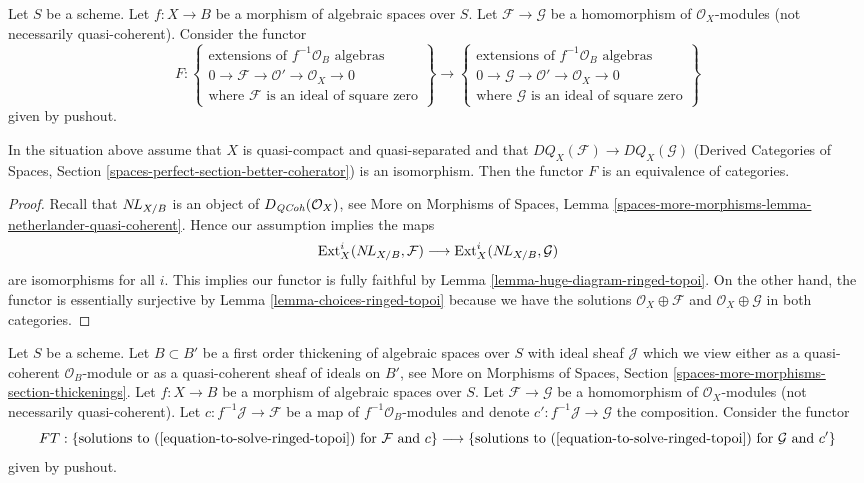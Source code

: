 \noindent
Let $S$ be a scheme. Let $f : X \to B$
be a morphism of algebraic spaces over $S$.
Let $\mathcal{F} \to \mathcal{G}$ be a homomorphism of $\mathcal{O}_X$-modules
(not necessarily quasi-coherent).
Consider the functor
$$
F :
\left\{
\begin{matrix}
\text{extensions of }f^{-1}\mathcal{O}_B\text{ algebras}\\
0 \to \mathcal{F} \to \mathcal{O}' \to \mathcal{O}_X \to 0\\
\text{where }\mathcal{F}\text{ is an ideal of square zero}
\end{matrix}
\right\}
\longrightarrow
\left\{
\begin{matrix}
\text{extensions of }f^{-1}\mathcal{O}_B\text{ algebras}\\
0 \to \mathcal{G} \to \mathcal{O}' \to \mathcal{O}_X \to 0\\
\text{where }\mathcal{G}\text{ is an ideal of square zero}
\end{matrix}
\right\}
$$
given by pushout.

\begin{lemma}
\label{lemma-thickening-space-quasi-coherent}
In the situation above assume that $X$ is quasi-compact and quasi-separated
and that $DQ_X(\mathcal{F}) \to DQ_X(\mathcal{G})$
(Derived Categories of Spaces, Section
\ref{spaces-perfect-section-better-coherator})
is an isomorphism. Then the functor $F$ is an equivalence of categories.
\end{lemma}

\begin{proof}
Recall that $\mathop{N\!L}\nolimits_{X/B}$ is an object of $D_{\mathit{QCoh}}(\mathcal{O}_X)$, see
More on Morphisms of Spaces, Lemma
\ref{spaces-more-morphisms-lemma-netherlander-quasi-coherent}.
Hence our assumption implies the maps
$$
\mathop{\mathrm{Ext}}\nolimits^i_X(\mathop{N\!L}\nolimits_{X/B}, \mathcal{F}) \longrightarrow
\mathop{\mathrm{Ext}}\nolimits^i_X(\mathop{N\!L}\nolimits_{X/B}, \mathcal{G})
$$
are isomorphisms for all $i$. This implies our functor is fully
faithful by Lemma \ref{lemma-huge-diagram-ringed-topoi}.
On the other hand, the functor is essentially surjective by
Lemma \ref{lemma-choices-ringed-topoi} because
we have the solutions $\mathcal{O}_X \oplus \mathcal{F}$
and $\mathcal{O}_X \oplus \mathcal{G}$ in both categories.
\end{proof}

\noindent
Let $S$ be a scheme. Let $B \subset B'$ be a first order thickening of
algebraic spaces over $S$ with ideal sheaf $\mathcal{J}$
which we view either as a quasi-coherent $\mathcal{O}_B$-module
or as a quasi-coherent sheaf of ideals on $B'$, see
More on Morphisms of Spaces, Section
\ref{spaces-more-morphisms-section-thickenings}.
Let $f : X \to B$ be a morphism of algebraic spaces over $S$.
Let $\mathcal{F} \to \mathcal{G}$ be a homomorphism of
$\mathcal{O}_X$-modules (not necessarily quasi-coherent).
Let $c : f^{-1}\mathcal{J} \to \mathcal{F}$ be a map
of $f^{-1}\mathcal{O}_B$-modules and denote
$c' : f^{-1}\mathcal{J} \to \mathcal{G}$ the composition.
Consider the functor
$$
FT :
\{\text{solutions to }(\ref{equation-to-solve-ringed-topoi})
\text{ for }\mathcal{F}\text{ and }c\}
\longrightarrow
\{\text{solutions to }(\ref{equation-to-solve-ringed-topoi})
\text{ for }\mathcal{G}\text{ and }c'\}
$$
given by pushout.

